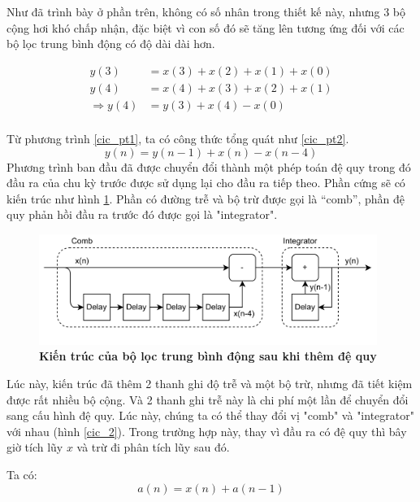 Như đã trình bày ở phần trên, không có số nhân trong thiết kế này, nhưng 3 bộ cộng hơi khó chấp nhận, đặc biệt vì con số đó sẽ tăng lên tương ứng đối với các bộ lọc trung bình động có độ dài dài hơn.

\begin{equation}\label{cic_pt1}
  \begin{aligned}
        y(3) &= x(3) + x(2) + x(1) + x(0)\\
        y(4) &=  x(4) + x(3) + x(2) + x(1)\\
        \Rightarrow y(4) &=  y(3) + x(4) -x(0)\\
\end{aligned}  
\end{equation}

Từ phương trình \ref{cic_pt1}, ta có công thức tổng quát như \ref{cic_pt2}.
\begin{equation} \label{cic_pt2}
    y(n) = y(n-1) + x(n) - x(n-4)
\end{equation}
Phương trình ban đầu đã được chuyển đổi thành một phép toán đệ quy trong đó đầu ra của chu kỳ trước được sử dụng lại cho đầu ra tiếp theo. Phần cứng sẽ có kiến trúc như hình \ref{cic_3}. Phần có đường trễ và bộ trừ được gọi là “comb”, phần đệ quy phản hồi đầu ra trước đó được gọi là "integrator".
\begin{figure}[H]
    \centering
    \includegraphics[width=11cm]{Images/Chuong2/cic/cic_3.png}
    \caption[Kiến trúc của bộ lọc trung bình động sau khi thêm đệ quy]{\bfseries \fontsize{12pt}{0pt}\selectfont Kiến trúc của bộ lọc trung bình động sau khi thêm đệ quy}
    \label{cic_3}
\end{figure}

Lúc này, kiến trúc đã thêm 2 thanh ghi độ trễ và một bộ trừ, nhưng đã tiết kiệm được rất nhiều bộ cộng. Và 2 thanh ghi trễ này là chi phí một lần để chuyển đổi sang cấu hình đệ quy. Lúc này, chúng ta có thể thay đổi vị "comb" và "integrator" với nhau (hình \ref{cic_2}). Trong trường hợp này, thay vì đầu ra có đệ quy thì bây giờ tích lũy $x$ và trừ đi phân tích lũy sau đó.

Ta có:
\begin{equation} \label{cic_pt3}
    a(n) = x(n) + a(n-1)
\end{equation}

